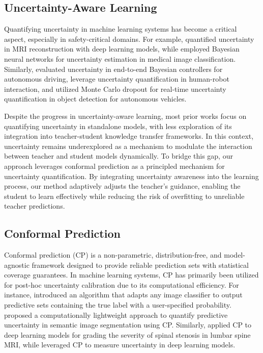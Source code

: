 \subsection{Uncertainty-Aware Learning}
\vspace{-5pt}
Quantifying uncertainty \cite{abdar2021review, kwon2020uncertainty, karimi2023quantifying} in machine learning systems has become a critical aspect, especially in safety-critical domains. For example, \citet{edupuganti2020uncertainty} quantified uncertainty in MRI reconstruction with deep learning models, while \citet{kwon2020uncertainty} employed Bayesian neural networks for uncertainty estimation in medical image classification. Similarly, \citet{michelmore2020uncertainty} evaluated uncertainty in end-to-end Bayesian controllers for autonomous driving, \cite{gao2023uncertainty, gao2021bayesian} leverage uncertainty quantification in human-robot interaction, and \citet{zhao2024leveraging} utilized Monte Carlo dropout for real-time uncertainty quantification in object detection for autonomous vehicles.

Despite the progress in uncertainty-aware learning, most prior works focus on quantifying uncertainty in standalone models, with less exploration of its integration into teacher-student knowledge transfer frameworks. In this context, uncertainty remains underexplored as a mechanism to modulate the interaction between teacher and student models dynamically. To bridge this gap, our approach leverages conformal prediction as a principled mechanism for uncertainty quantification. By integrating uncertainty awareness into the learning process, our method adaptively adjusts the teacher's guidance, enabling the student to learn effectively while reducing the risk of overfitting to unreliable teacher predictions.

\subsection{Conformal Prediction}
\vspace{-5pt}
Conformal prediction (CP) \cite{angelopoulos2020uncertainty, angelopoulos2021gentle, shafer2008tutorial} is a non-parametric, distribution-free, and model-agnostic framework designed to provide reliable prediction sets with statistical coverage guarantees. In machine learning systems, CP has primarily been utilized for post-hoc uncertainty calibration due to its computational efficiency. For instance, \citet{angelopoulos2020uncertainty} introduced an algorithm that adapts any image classifier to output predictive sets containing the true label with a user-specified probability. \citet{mossina2024conformal} proposed a computationally lightweight approach to quantify predictive uncertainty in semantic image segmentation using CP. Similarly, \citet{lu2022improving} applied CP to deep learning models for grading the severity of spinal stenosis in lumbar spine MRI, while \citet{karimi2023quantifying} leveraged CP to measure uncertainty in deep learning models.

